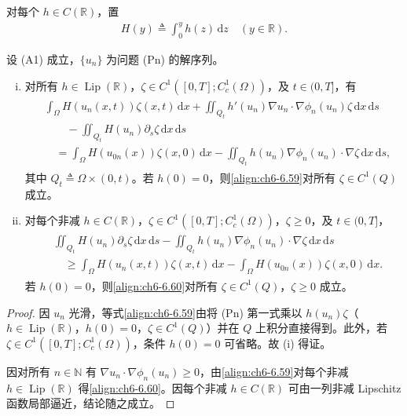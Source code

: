 \documentclass[../../main.tex]{subfiles}%
\begin{document}
对每个 $h\in C(\mathbb{R})$，置
\begin{align}
H(y)\triangleq \int_0^y h(z)\,\mathrm{d}z \quad(y\in\mathbb{R}). \label{align:ch6-6.58}
\end{align}

\begin{lemma}\label{lemma:ch06-6.5.4}
设 (A1) 成立，$\{u_n\}$ 为问题 (Pn) 的解序列。
\begin{enumerate}[(i)]
\item 对所有 $h\in\operatorname{Lip}(\mathbb{R})$，$\zeta\in C^1([0,T];C^1_c(\Omega))$，及 $t\in(0,T]$，有
\begin{align}
\begin{aligned}
&\int_\Omega H(u_n(x,t))\zeta(x,t)\,\mathrm{d}x
+\iint_{Q_t}h'(u_n)\nabla u_n\cdot\nabla\phi_n(u_n)\zeta\,\mathrm{d}x\,\mathrm{d}s\\
&\qquad-\iint_{Q_t}H(u_n)\partial_s\zeta\,\mathrm{d}x\,\mathrm{d}s\\
&\quad=\int_\Omega H(u_{0n}(x))\zeta(x,0)\,\mathrm{d}x
-\iint_{Q_t}h(u_n)\nabla\phi_n(u_n)\cdot\nabla\zeta\,\mathrm{d}x\,\mathrm{d}s,
\end{aligned} \label{align:ch6-6.59}
\end{align}
其中 $Q_t\triangleq \Omega\times(0,t)$。若 $h(0)=0$，则\eqref{align:ch6-6.59}对所有 $\zeta\in C^1(Q)$ 成立。
\item 对每个非减 $h\in C(\mathbb{R})$，$\zeta\in C^1([0,T];C^1_c(\Omega))$，$\zeta\geqslant0$，及 $t\in(0,T]$，
\begin{align}
\begin{aligned}
&\iint_{Q_t}H(u_n)\partial_s\zeta\,\mathrm{d}x\,\mathrm{d}s
-\iint_{Q_t}h(u_n)\nabla\phi_n(u_n)\cdot\nabla\zeta\,\mathrm{d}x\,\mathrm{d}s\\
&\quad\geqslant\int_\Omega H(u_n(x,t))\zeta(x,t)\,\mathrm{d}x
-\int_\Omega H(u_{0n}(x))\zeta(x,0)\,\mathrm{d}x.
\end{aligned} \label{align:ch6-6.60}
\end{align}
若 $h(0)=0$，则\eqref{align:ch6-6.60}对所有 $\zeta\in C^1(Q)$，$\zeta\geqslant0$ 成立。
\end{enumerate}
\end{lemma}

\begin{proof}
因 $u_n$ 光滑，等式\eqref{align:ch6-6.59}由将 (Pn) 第一式乘以 $h(u_n)\zeta$（$h\in\operatorname{Lip}(\mathbb{R})$，$h(0)=0$，$\zeta\in C^1(Q)$）并在 $Q$ 上积分直接得到。此外，若 $\zeta\in C^1([0,T];C^1_c(\Omega))$，条件 $h(0)=0$ 可省略。故 (i) 得证。

因对所有 $n\in\mathbb{N}$ 有 $\nabla u_n\cdot\nabla\phi_n(u_n)\geqslant0$，由\eqref{align:ch6-6.59}对每个非减 $h\in\operatorname{Lip}(\mathbb{R})$ 得\eqref{align:ch6-6.60}。因每个非减 $h\in C(\mathbb{R})$ 可由一列非减 Lipschitz 函数局部逼近，结论随之成立。
\end{proof}
\end{document}
